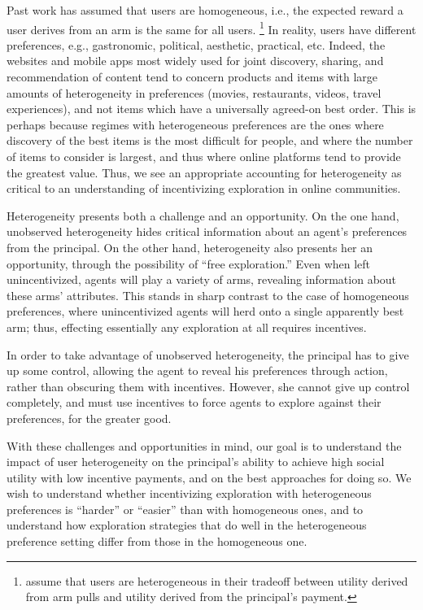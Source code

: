 Past work has assumed that users are homogeneous, i.e., the expected
reward a user derives from an arm is the same for all users.%
\footnote{\citet{han2015incentivizing} assume that users are
heterogeneous in their tradeoff between utility derived from arm pulls
and utility derived from the principal's payment.}
In reality, users have different preferences, e.g., gastronomic,
political, aesthetic, practical, etc.
Indeed, the websites and mobile apps most widely used for joint discovery,
sharing, and recommendation of content tend to concern products and items 
with large amounts of heterogeneity in preferences (movies, restaurants,
videos, travel experiences), and not items which have a universally
agreed-on best order.
This is perhaps because regimes with heterogeneous preferences are the
ones where discovery of the best items is the most difficult for people, and
where the number of items to consider is largest, and thus where online
platforms tend to provide the greatest value.  Thus, we see an appropriate
accounting for heterogeneity as critical to an understanding of incentivizing
exploration in online communities.

Heterogeneity presents both a challenge and an opportunity.
On the one hand, unobserved heterogeneity hides critical
information about an agent's preferences from the principal.
On the other hand, heterogeneity also presents her an opportunity,
through the possibility of ``free exploration.''
Even when left unincentivized, agents will
play a variety of arms, revealing information about these arms' attributes.
This stands in sharp contrast to the case of homogeneous preferences,
where unincentivized agents will herd onto a single apparently best arm;
thus, effecting essentially any exploration at all requires incentives.

In order to take advantage of unobserved heterogeneity,
the principal has to give up some control, allowing the agent to
reveal his preferences through action, rather than obscuring them with
incentives.
However, she cannot give up control completely,
and must use incentives to force agents to explore against their
preferences, for the greater good. 

With these challenges and opportunities in mind, our goal is to understand the
impact of user heterogeneity on the principal's ability to achieve
high social utility with low incentive payments,
and on the best approaches for doing so.
We wish to understand whether incentivizing exploration with
heterogeneous preferences  is ``harder'' or ``easier'' than with
homogeneous ones,
and to understand how exploration strategies that do well in the
heterogeneous preference setting differ from those in the homogeneous one.

